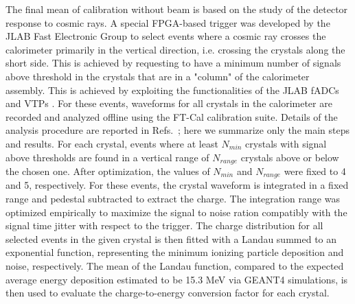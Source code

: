 The final mean of calibration without beam is based on the study of the detector response to cosmic rays. A special FPGA-based trigger was developed by the JLAB Fast Electronic Group to select events where a cosmic ray crosses the calorimeter primarily in the vertical direction, i.e. crossing the crystals along the short side. This is achieved by requesting to have a minimum number of signals above threshold in the crystals that are in a "column" of the calorimeter assembly. This is achieved by exploiting the functionalities of the JLAB fADCs and VTPs \cite{daq,trigger}. For these events, waveforms for all crystals in the calorimeter are recorded and analyzed offline using the FT-Cal calibration suite. Details of the analysis procedure are reported in Refs.~\cite{cosmics1,cosmics2}; here we summarize only the main steps and results. For each crystal, events where at least $N_{min}$ crystals with signal above thresholds are found in a vertical range of $N_{range}$ crystals above or below the chosen one. After optimization, the values of $N_{min}$ and $N_{range}$ were fixed to 4 and 5, respectively. For these events, the crystal waveform is integrated in a fixed range and pedestal subtracted to extract the charge. The integration range was optimized empirically to maximize the signal to noise ration compatibly with the signal time jitter  with respect to the trigger. The charge distribution for all selected events in the given crystal is then fitted with a Landau summed to an exponential function, representing the minimum ionizing particle deposition and noise, respectively. The mean of the Landau function, compared to the expected average energy deposition estimated to be 15.3 MeV via GEANT4 simulations, is then used to evaluate the charge-to-energy conversion factor for each crystal. 
